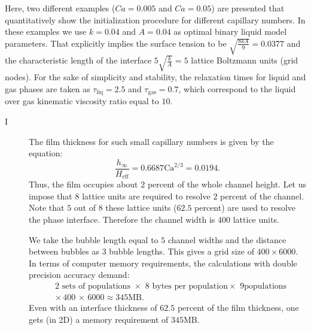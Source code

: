 \documentclass[preprint,12pt]{elsarticle}
\newcommand{\Ca}{\mathrm{Ca}}
\begin{document}
Here, two different examples ($Ca=0.005$ and $Ca=0.05$) are presented that quantitatively show the
initialization procedure for different capillary numbers. In these
examples we use $k=0.04$ and $A=0.04$ as optimal binary liquid model parameters.
That explicitly implies the surface tension to be $\sqrt{\frac{8 k
A}{9}}=0.0377$ and the characteristic length of the interface
$5\sqrt{\frac{k}{A}}=5$ lattice Boltzmann units (grid nodes). For the sake of simplicity and
stability, the relaxation times for liquid and gas phases are taken as
$\tau_{\mathrm{liq}}=2.5$ and $\tau_{\mathrm{gas}}=0.7$, which correspond
to the liquid over gas kinematic viscosity ratio equal to $10$.
\begin{description}
 \item[I ]
  The film thickness for such small capillary numbers \cite{bretherton} is
given by the equation:
  \begin{equation}
  \frac{h_{\infty}}{H_{\mathrm{eff}}}=0.6687 \Ca^{2/3}=0.0194.
  \end{equation}
Thus, the film
 occupies about $2$ percent of the whole channel height. Let us impose that $8$ lattice
units are required to resolve  $2$ percent of the channel. Note that $5$ out of $8$ these lattice
units
($62.5$ percent) are used to resolve the phase interface. Therefore the channel width is $400$
lattice units.

We take the bubble length equal to $5$ channel widths
  and the distance between bubbles as $3$ bubble lengths. This gives a
grid size of $400 \times 6000$. In terms of computer memory
requirements, the calculations with double precision accuracy demand:
\begin{equation}
\begin{aligned}
&2\text{ sets of populations } \times \,\, 8\,\, \text{bytes per population
} \times \,\, 9 \text{
populations}\\
&\times\,400\,\times\,6000\approx 345 \mathrm{MB}. 
\end{aligned}
\end{equation}
Even with an interface thickness of $62.5$ percent  of the
film thickness, one gets (in 2D) a memory
requirement of $345 \mathrm{MB}$. 


\end{description}
\end{document}
